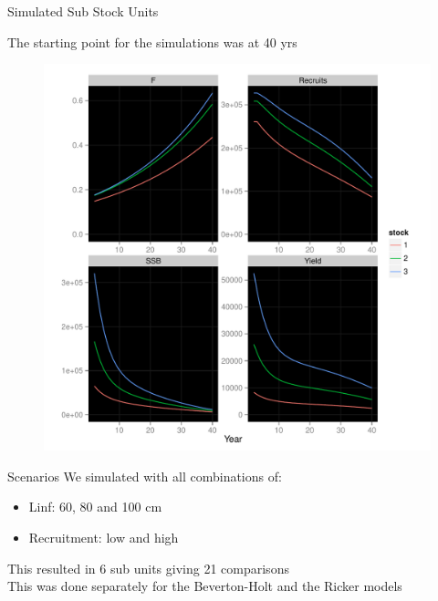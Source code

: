 \documentclass{beamer}
\begin{document}
\begin{withoutheadline}
\begin{frame}{Simulated Sub Stock Units}
  \begin{minipage}{.3\textwidth}
    The starting point for the simulations was at 40 yrs
  \end{minipage}
  \hspace{0.25cm}  
  \begin{minipage}{.65\textwidth}
  \begin{figure}
  \flushleft
  \includegraphics[width=\textwidth]{stock-unit1}
  \end{figure}
  \end{minipage}
\end{frame}
\end{withoutheadline}



\begin{withoutheadline}
\begin{frame}{Scenarios}
We simulated with all combinations of:\\

\vspace{.25cm}
\begin{itemize}
\item[ ] Linf: 60, 80 and 100 cm
\item[ ] Recruitment: low and high
\end{itemize}
\vspace{.25cm}
This resulted in 6 sub units giving 21 comparisons \\
\vspace{.5cm}
This was done separately for the Beverton-Holt and the Ricker models
\end{frame}
\end{withoutheadline}
\end{document}
